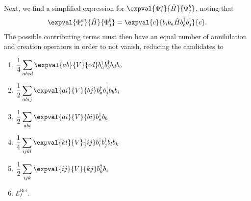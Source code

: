 Next, we find a simplified expression for $\expval{\Phi_i^a}{\hat{H}}{\Phi_j^b}$,
noting that
\begin{equation*}
    \expval{\Phi_i^a}{\hat{H}}{\Phi_j^b} = \expval{c}{b_i b_a \hat{H} b_b^\dagger b_j^\dagger}{c}.
\end{equation*}
The possible contributing terms must then have an equal number of annihilation and creation operators in order to not vanish, reducing the candidates to
\begin{multicols}{2}{}
    \begin{enumerate}
        \item  $\displaystyle\frac{1}{4} \sum_{abcd} \expval{ab}{V}{cd} b_a^\dagger b_b^\dagger b_d b_c$
        \item  $\displaystyle\frac{1}{2} \sum_{abij} \expval{ai}{V}{bj} b_a^\dagger b_j^\dagger b_b b_i$
        \item  $\displaystyle\frac{1}{2} \sum_{abi} \expval{ai}{V}{bi} b_a^\dagger b_b$
        \item  $\displaystyle\frac{1}{4} \sum_{ijkl} \expval{kl}{V}{ij} b_i^\dagger b_j^\dagger b_l b_k$
        \item  $\displaystyle\frac{1}{2} \sum_{ijk} \expval{ij}{V}{kj} b_k^\dagger b_i$
        \item  $\displaystyle\mathcal{E}_I^\text{Ref}.$
    \end{enumerate}
\end{multicols}

